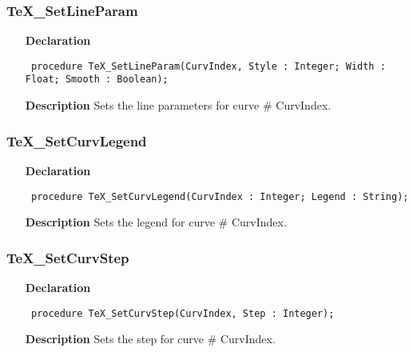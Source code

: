 \documentclass[12pt,a4paper,oneside]{report}
\newcommand{\declarationitem}[1]{\textbf{#1}}
\newcommand{\descriptiontitle}[1]{\textbf{#1}}
\newcommand{\code}[1]{\texttt{#1}}
\begin{document}
\subsubsection{TeX{\_}SetLineParam}
\label{utexplot-TeX_SetLineParam}
\begin{itemize}\item[\declarationitem{Declaration}\hfill]
	\begin{flushleft}
		\code{
			procedure TeX{\_}SetLineParam(CurvIndex, Style : Integer; Width : Float; Smooth : Boolean);}
		
	\end{flushleft}
	
	\par
	\item[\descriptiontitle{Description}]
	Sets the line parameters for curve {\#} CurvIndex.
	
\end{itemize}
\subsubsection{TeX{\_}SetCurvLegend}
\label{utexplot-TeX_SetCurvLegend}
\begin{itemize}\item[\declarationitem{Declaration}\hfill]
	\begin{flushleft}
		\code{
			procedure TeX{\_}SetCurvLegend(CurvIndex : Integer; Legend : String);}
		
	\end{flushleft}
	
	\par
	\item[\descriptiontitle{Description}]
	Sets the legend for curve {\#} CurvIndex.
	
\end{itemize}
\subsubsection{TeX{\_}SetCurvStep}
\label{utexplot-TeX_SetCurvStep}
\begin{itemize}\item[\declarationitem{Declaration}\hfill]
	\begin{flushleft}
		\code{
			procedure TeX{\_}SetCurvStep(CurvIndex, Step : Integer);}
		
	\end{flushleft}
	
	\par
	\item[\descriptiontitle{Description}]
	Sets the step for curve {\#} CurvIndex.
	
\end{itemize}
\end{document}
